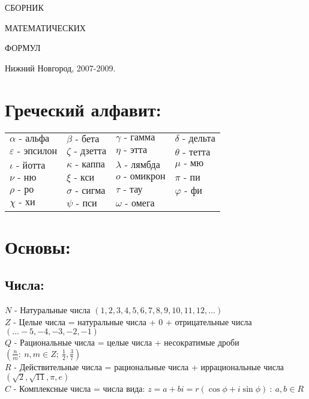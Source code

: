 \documentclass[12pt, a6paper]{extarticle}
\begin{document}
\begin{titlepage}
\vspace*{5cm}
\begin{center}
{\Huge СБОРНИК}
\end{center}
\begin{center}
{\Huge МАТЕМАТИЧЕСКИХ}
\end{center}
\begin{center}
{\Huge ФОРМУЛ}
\end{center}
\vfill 
\begin{center} 
{\rm \large Нижний Новгород, 2007-2009.} 
\end {center} 
\end{titlepage} 
\tableofcontents
\newpage
\section{Греческий алфавит:}
\begin{tabular}{llll}
	$ \alpha    \text{ - альфа}$   & $ \beta  \text{ - бета}$    & $ \gamma    \text{ - гамма}$   & $ \delta \text{ - дельта}$  \\
  $ \varepsilon  \text{ - эпсилон}$ & $ \zeta  \text{ - дзетта}$  & $ \eta      \text{ - этта}$    & $ \theta \text{ - тетта}$  \\
  $ \iota     \text{ - йотта}$   & $ \kappa \text{ - каппа}$   & $ \lambda   \text{ - лямбда }$ & $ \mu    \text{ - мю}$     \\
	$ \nu       \text{ - ню}$      & $ \xi    \text{ - кси}$     & $ o         \text{ - омикрон}$ & $ \pi    \text{ - пи}$     \\
	$ \rho      \text{ - ро}$      & $ \sigma \text{ - сигма}$   & $ \tau      \text{ - тау}$     & $ \varphi   \text{ - фи}$     \\
	$ \chi      \text{ - хи}$      & $ \psi   \text{ - пси}$     & $ \omega \text{ - омега}$      & $ $ \\
	
\end{tabular}
\newpage
\section{Основы:}
\subsection{Числа:}
$N$ - Натуральные числа $(1, 2, 3, 4, 5, 6, 7, 8, 9, 10, 11, 12, \ldots)$ \\
$Z$ - Целые числа = натуральные числа + $0$ + отрицательные числа $(\ldots -5, -4, -3, -2, -1)$ \\
$Q$ - Рациональные числа = целые числа + несократимые дроби $ \displaystyle \left(\frac{n}{m}:\ n,m \in Z; \ \frac{1}{2},\frac{3}{7}\right)$ \\
$R$ - Действительные числа = рациональные числа + иррациональные числа $\displaystyle (\sqrt{2},\sqrt{11}, \pi, e)$ \\
$C$ - Комплексные числа = числа вида: $z = a + bi = r(\cos \phi + i \sin \phi) \ : \ a,b \in R$
\end{document}
